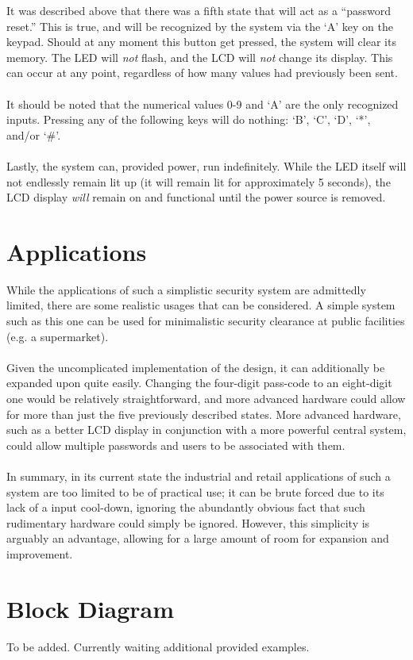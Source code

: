 \documentclass[10pt,a4paper]{article}
\begin{document}
\pagebreak
It was described above that there was a fifth state that will act as a ``password reset.'' This is true, and will be recognized by the system via the `A' key on the keypad. Should at any moment this button get pressed, the system will clear its memory. The LED will \textit{not} flash, and the LCD will \textit{not} change its display. This can occur at any point, regardless of how many values had previously been sent. \\~\\
It should be noted that the numerical values 0-9 and `A' are the only recognized inputs. Pressing any of the following keys will do nothing: `B', `C', `D', `*', and/or `\#'. \\~\\
Lastly, the system can, provided power, run indefinitely. While the LED itself will not endlessly remain lit up (it will remain lit for approximately 5 seconds), the LCD display \textit{will} remain on and functional until the power source is removed.
\pagebreak
\section{Applications}
While the applications of such a simplistic security system are admittedly limited, there are some realistic usages that can be considered. A simple system such as this one can be used for minimalistic security clearance at public facilities (e.g. a supermarket). \\~\\
Given the uncomplicated implementation of the design, it can additionally be expanded upon quite easily. Changing the four-digit pass-code to an eight-digit one would be relatively straightforward, and more advanced hardware could allow for more than just the five previously described states. More advanced hardware, such as a better LCD display in conjunction with a more powerful central system, could allow multiple passwords and users to be associated with them. \\~\\
In summary, in its current state the industrial and retail applications of such a system are too limited to be of practical use; it can be brute forced due to its lack of a input cool-down, ignoring the abundantly obvious fact that such rudimentary hardware could simply be ignored. However, this simplicity is arguably an advantage, allowing for a large amount of room for expansion and improvement.
\pagebreak
\section{Block Diagram}
To be added. Currently waiting additional provided examples.
\pagebreak
\end{document}

